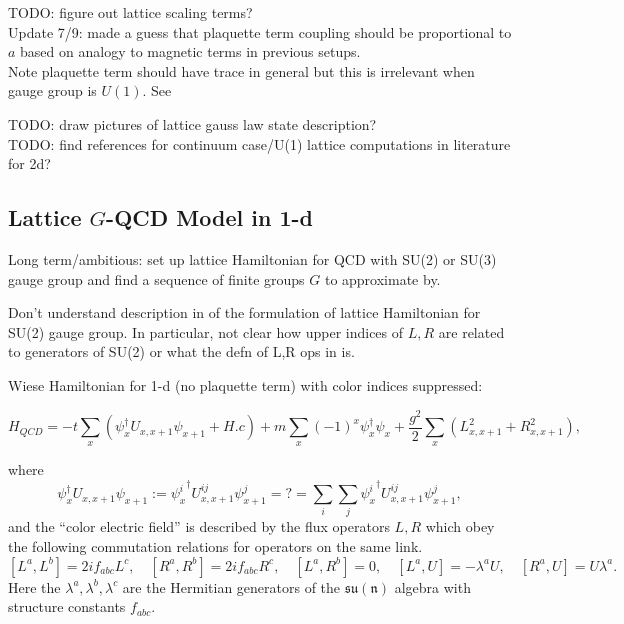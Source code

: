 \documentclass[10pt,reqno]{amsart}
\begin{document}
	TODO: figure out lattice scaling terms? \\
	\qquad Update 7/9: made a guess that plaquette term coupling should be proportional to $a$ based on analogy to magnetic terms in previous setups.\\
	Note plaquette term should have trace in general but this is irrelevant when gauge group is $U(1)$. See \cite{ZoharBurrello15}
	
	
	TODO: draw pictures of lattice gauss law state description?\\
	
	TODO: find references for continuum case/U(1) lattice computations in literature for 2d?
	
	\subsection{Lattice $G$-QCD Model in 1-d}
	
	Long term/ambitious: set up lattice Hamiltonian for QCD with SU(2) or SU(3) gauge group and find a sequence of finite groups $G$ to approximate by.
	
	Don't understand description in \cite{KogutSusskind75,Wiese13} of the formulation of lattice Hamiltonian for SU(2) gauge group.
	In particular, not clear how upper indices of $L,R$ are related to generators of SU(2) or what the defn of L,R ops in \cite{Wiese13} is.
	
	Wiese Hamiltonian for 1-d (no plaquette term) with color indices suppressed:
	
	\begin{equation}
		H_{QCD}=-t\sum_{x} (\psi_x^\dagger U_{x,x+1} \psi_{x+1} + H.c) + m \sum_{x} (-1)^x \psi_x^\dagger\psi_x + \frac{g^2}{2} \sum_{x} (L_{x,x+1}^2+R_{x,x+1}^2),
	\end{equation}
	
	where 
		\[\psi_x^\dagger U_{x,x+1} \psi_{x+1} := {\psi_x^i}^\dagger U_{x,x+1}^{ij} \psi_{x+1}^j =?= \sum_i \sum_j {\psi_x^i}^\dagger U_{x,x+1}^{ij} \psi_{x+1}^j,\]
	and the ``color electric field'' is described by the flux operators $L,R$ which obey the following commutation relations for operators on the same link.
		\[ [L^a,L^b]=2if_{abc}L^c, \quad [R^a,R^b]=2if_{abc}R^c, \quad [L^a,R^b]=0, \quad [L^a,U]=-\lambda^a U, \quad [R^a,U]=U\lambda^a. \]
	Here the $\lambda^a,\lambda^b,\lambda^c$ are the Hermitian generators of the $\mathfrak{su(n)}$ algebra with structure constants $f_{abc}$.\\
	
\end{document}
